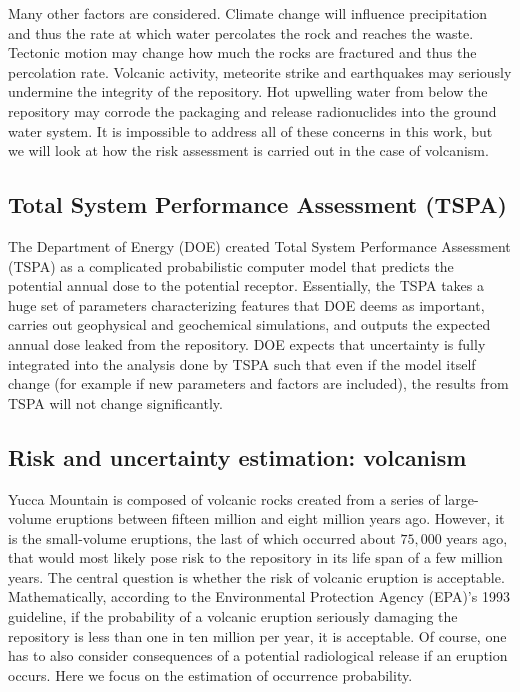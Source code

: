 \documentclass[nofootinbib,preprint,aps]{revtex4-1}
\begin{document}
        Many other factors are considered. Climate change will influence precipitation and thus the
        rate at which water percolates the rock and reaches the waste. 
        Tectonic motion may change how much the rocks are fractured and thus the percolation rate.
        Volcanic activity, meteorite strike and earthquakes may seriously undermine the integrity of the repository.
        Hot upwelling water from below the repository may corrode the packaging and release radionuclides into
        the ground water system. It is impossible to address all of these concerns in this work, but we will look
        at how the risk assessment is carried out in the case of volcanism.

        \subsection{Total System Performance Assessment (TSPA)}
        The Department of Energy (DOE) created Total System Performance Assessment (TSPA) as a complicated
        probabilistic
        computer model that predicts the potential annual dose to the potential receptor.
        Essentially, the TSPA takes a huge set of parameters characterizing features that DOE deems as important,
        carries out geophysical and geochemical simulations,
        and outputs the expected annual dose leaked from the repository.
        DOE expects that
        uncertainty is fully integrated into the analysis done by TSPA such that even if the model itself change
        (for example if new parameters and factors are included), the results from TSPA will not change
        significantly.\cite{cv14,ocrwm02} 

        \subsection{Risk and uncertainty estimation: volcanism}
        \label{sec:volcano}
        Yucca Mountain is composed of volcanic rocks created from a series of large-volume eruptions between
        fifteen million and eight million years ago. However, it is the small-volume eruptions, the last of
        which occurred about $75,000$ years ago, that would most likely pose risk to the repository
        in its life span of a few million years.
        The central question is whether the risk of volcanic eruption is acceptable. Mathematically,
        according to the Environmental Protection Agency (EPA)'s 1993 guideline,
        if the probability of a volcanic eruption seriously damaging the repository is less than
        one in ten million per year, it is acceptable.\cite{epa93}
        Of course, one has to also consider consequences of a potential radiological release if an eruption
        occurs. Here we focus on the estimation of occurrence probability.
\end{document}
